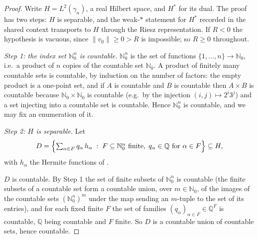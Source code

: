 \begin{proof}
Write $H = L^2(\gamma_n)$, a real Hilbert space, and $H^*$ for its dual.  The
proof has two steps: $H$ is separable, and the weak-$*$ statement for $H^*$
recorded in the shared context transports to $H$ through the Riesz
representation.  If $R < 0$ the hypothesis is vacuous, since
$\|v_0\| \geq 0 > R$ is impossible; so $R \geq 0$ throughout.

\emph{Step 1: the index set $\mathbb{N}_0^n$ is countable.}
$\mathbb{N}_0^n$ is the set of functions $\{1,\dots,n\} \to \mathbb{N}_0$, i.e.\ a
product of $n$ copies of the countable set $\mathbb{N}_0$.  A product of finitely
many countable sets is countable, by induction on the number of factors: the
empty product is a one-point set, and if $A$ is countable and $B$ is countable
then $A \times B$ is countable because $\mathbb{N}_0 \times \mathbb{N}_0$ is
countable (e.g.\ by the injection $(i,j) \mapsto 2^i 3^j$) and a set injecting
into a countable set is countable.  Hence $\mathbb{N}_0^n$ is countable, and we
may fix an enumeration of it.

\emph{Step 2: $H$ is separable.}
Let
\[
  D = \Bigl\{\textstyle\sum_{\alpha \in F} q_\alpha\, h_\alpha
      \;:\; F \subseteq \mathbb{N}_0^n \text{ finite},\;
            q_\alpha \in \mathbb{Q} \text{ for } \alpha \in F \Bigr\}
    \subseteq H ,
\]
with $h_\alpha$ the Hermite functions of .

$D$ is countable.  By Step 1 the set of finite subsets of $\mathbb{N}_0^n$ is
countable (the finite subsets of a countable set form a countable union, over
$m \in \mathbb{N}_0$, of the images of the countable sets
$(\mathbb{N}_0^n)^m$ under the map sending an $m$-tuple to the set of its
entries), and for each fixed finite $F$ the set of families
$(q_\alpha)_{\alpha \in F} \in \mathbb{Q}^F$ is countable, $\mathbb{Q}$ being
countable and $F$ finite.  So $D$ is a countable union of countable sets, hence
countable.


\end{proof}

